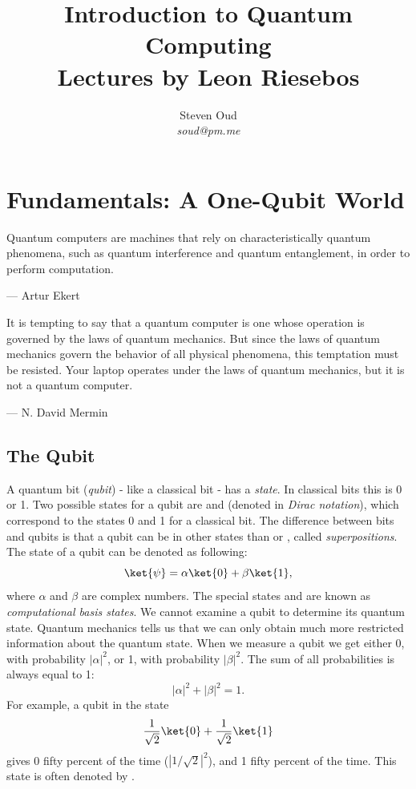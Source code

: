 \documentclass[11pt, notitlepage]{report}
\title{\textbf{Introduction to Quantum Computing \\
\large Lectures by Leon Riesebos}}
\author{Steven Oud \\ \emph{soud@pm.me}}
\makeatletter
\newcommand*{\toccontents}{\@starttoc{toc}}
\makeatother
\begin{document}
     
\maketitle

\toccontents

\newpage

\chapter{Fundamentals: A One-Qubit World}
\epigraph{Quantum computers are machines that rely on characteristically quantum phenomena, such as quantum interference and quantum entanglement, in order to perform computation.}{--- Artur Ekert}

\epigraph{It is tempting to say that a quantum computer is one whose operation is governed by the laws of quantum mechanics. But since the laws of quantum mechanics govern the behavior of all physical phenomena, this temptation must be resisted. Your laptop operates under the laws of quantum mechanics, but it is not a quantum computer.}{--- N. David Mermin}

\section{The Qubit}
A quantum bit (\emph{qubit}) - like a classical bit - has a \emph{state}. In classical bits this is 0 or 1. Two possible states for a qubit are  and  (denoted in \emph{Dirac notation}), which correspond to the states 0 and 1 for a classical bit. The difference between bits and qubits is that a qubit can be in other states than  or , called \emph{superpositions}. The state of a qubit can be denoted as following:
\begin{equation}
  \ket{\psi} = \alpha\ket{0} + \beta\ket{1},
\end{equation}
where $\alpha$ and $\beta$ are complex numbers. The special states  and  are known as \emph{computational basis states}. We cannot examine a qubit to determine its quantum state. Quantum mechanics tells us that we can only obtain much more restricted information about the quantum state. When we measure a qubit we get either 0, with probability $|\alpha|^2$, or 1, with probability $|\beta|^2$. The sum of all probabilities is always equal to 1:
\begin{equation}
  |\alpha|^2 + |\beta|^2 = 1.
\end{equation}
For example, a qubit in the state
\begin{equation}
  \dfrac{1}{\sqrt2}\ket{0}+\dfrac{1}{\sqrt2}\ket{1}
\end{equation}
gives 0 fifty percent of the time ($|1/\sqrt2|^2$), and 1 fifty percent of the time. This state is often denoted by \ket{+}.
\end{document}
